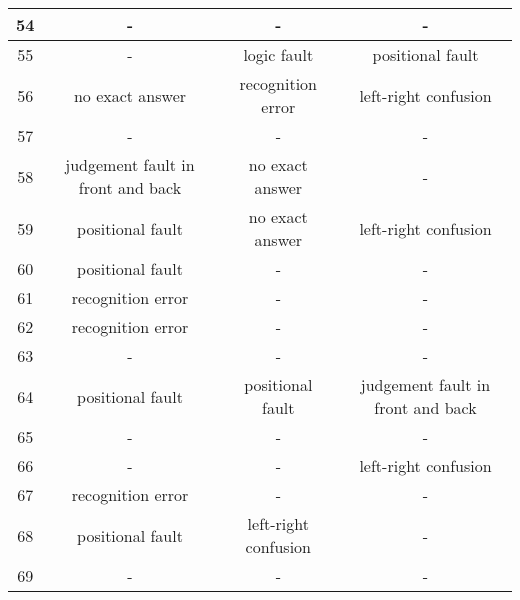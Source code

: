 \begin{table*}[ht]
{\begin{tabular}{|c|c|c|c|}
        54              & -                                 & -                    & -                                 \\ \hline
        55              & -                                 & logic fault           & positional fault                 \\ \hline
        56              & no exact answer                   & recognition error    & left-right confusion              \\ \hline
        57              & -                                 & -                    & -                                 \\ \hline
        58              & judgement fault in front and back & no exact answer      & -                                 \\ \hline
        59              & positional fault                 & no exact answer      & left-right confusion              \\ \hline
        60              & positional fault                 & -                    & -                                 \\ \hline
        61              & recognition error                 & -                    & -                                 \\ \hline
        62              & recognition error                 & -                    & -                                 \\ \hline
        63              & -                                 & -                    & -                                 \\ \hline
        64              & positional fault                 & positional fault    & judgement fault in front and back \\ \hline
        65              & -                                 & -                    & -                                 \\ \hline
        66              & -                                 & -                    & left-right confusion              \\ \hline
        67              & recognition error                 & -                    & -                                 \\ \hline
        68              & positional fault                 & left-right confusion & -                                 \\ \hline
        69              & -                                 & -                    & -                                 \\ \hline

\end{tabular}}
\end{table*}
